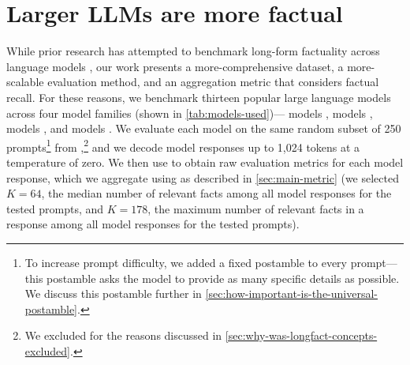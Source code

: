 \documentclass{article}
\theoremstyle{plain}
\theoremstyle{definition}
\theoremstyle{remark}
\begin{document}




\section{Larger LLMs are more factual}
\label{sec:main-results}



While prior research has attempted to benchmark long-form factuality across language models \citep{min2023factscore}, our work presents a more-comprehensive dataset, a more-scalable evaluation method, and an aggregation metric that considers factual recall.
For these reasons, we benchmark thirteen popular large language models across four model families (shown in \cref{tab:models-used})---\gemini{} models \citep{gemini2023}, \gpt{} models \citep{chatgpt,openai2023gpt4}, \claude{} models \citep{claude2,claude3}, and \ulm{} models \citep{anil2023palm}.
We evaluate each model on the same random subset of 250 prompts\footnote{To increase prompt difficulty, we added a fixed postamble to every prompt---this postamble asks the model to provide as many specific details as possible. We discuss this postamble further in \cref{sec:how-important-is-the-universal-postamble}.} from \longfactobjects{},\footnote{We excluded \longfactconcepts{} for the reasons discussed in \cref{sec:why-was-longfact-concepts-excluded}.} and we decode model responses up to 1,024 tokens at a temperature of zero.
We then use \safe{} to obtain raw evaluation metrics for each model response, which we aggregate using \metric{} as described in \cref{sec:main-metric} (we selected $K = 64$, the median number of relevant facts among all model responses for the tested prompts, and $K = 178$, the maximum number of relevant facts in a response among all model responses for the tested prompts).
\end{document}
